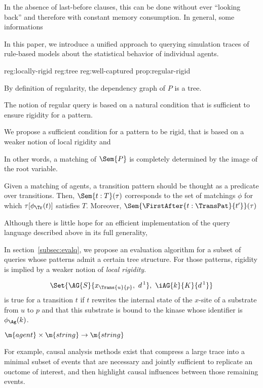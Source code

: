 


\label{subsec:tpats-language}

In the absence of \textsf{last-before} clauses, this can be done
without ever ``looking back'' and therefore with constant memory
consumption. In general, some informations

 In this paper, we introduce a unified approach to querying
  simulation traces of rule-based models about the statistical
  behavior of individual agents.

{reg:locally-rigid}
{reg:tree}
{reg:well-captured}
{prop:regular-rigid}

By definition of regularity,
the dependency graph of $P$ is a tree.

The notion of regular query is based on a natural condition that is
sufficient to ensure rigidity for a pattern.

We propose a sufficient condition for a pattern to be rigid, that is based
on a weaker notion of local rigidity and


In other words, a matching of $\Sem{P}$ is completely determined by
the image of the root variable.


Given a matching of agents, a transition pattern should be thought as
a predicate over transitions. Then, $\Sem{t:T}(\tau)$ corresponds to
the set of matchings $\phi$ for which $\tau[\phi_{\Tr}(t)]$ satisfies
$T$. Moreover, $\Sem{\FirstAfter{t:\TransPat}{t'}}(\tau)$

Although there is little hope for an efficient implementation of the
query language described above in its full generality, 

In section~\ref{subsec:evalq}, we propose an evaluation algorithm for
a subset of queries whose patterns admit a certain tree structure. For
those patterns, rigidity is implied by a weaker notion of \emph{local
  rigidity}.

\[ \Set{ \AG{S}{x_{\Trans{u}{p}},\ d^{\,1}},\ \iAG{k}{K}{d^{\,1}} } \]
is true for a transition $t$ if $t$ rewrites the internal state of the
$x$-site of a substrate from $u$ to $p$ and that this substrate is
bound to the kinase whose identifier is $\phi_{\Ag}(k)$.

$\m{agent} \times \m{string} \to \m{string}$

For example, causal analysis methods exist
\cite{DanosEtAl-CONCUR07,DBLP:conf/fsttcs/DanosFFHH12} that compress a
large trace into a minimal subset of events that are necessary and
jointly sufficient to replicate an ouctome of interest, and then
highlight causal influences between those remaining events.

